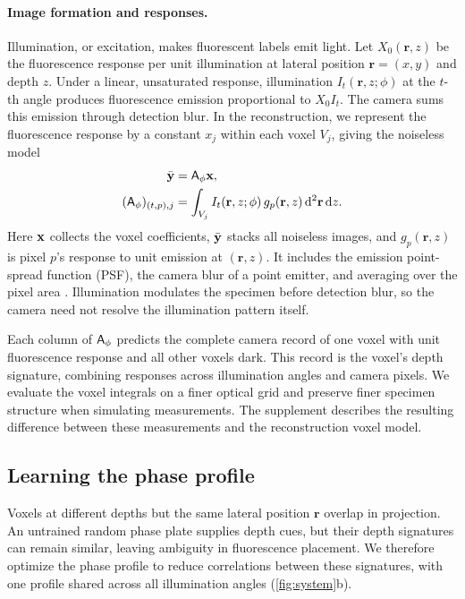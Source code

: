 \paragraph{Image formation and responses.}
Illumination, or excitation, makes fluorescent labels emit light. Let $X_0(\mathbf r,z)$ be the fluorescence response per unit illumination at lateral position $\mathbf r=(x,y)$ and depth $z$. Under a linear, unsaturated response, illumination $I_t(\mathbf r,z;\phi)$ at the $t$-th angle produces fluorescence emission proportional to $X_0I_t$. The camera sums this emission through detection blur. In the reconstruction, we represent the fluorescence response by a constant $x_j$ within each voxel $V_j$, giving the noiseless model
\begin{equation}
\begin{aligned}
\bar{\mathbf{y}}&=\mathsf{A}_\phi\mathbf{x},\\
(\mathsf{A}_\phi)_{(t,p),j}
&=\int_{V_j} I_t(\mathbf r,z;\phi)\,g_p(\mathbf r,z)
\,\mathrm d^2\mathbf r\,\mathrm dz.
\end{aligned}
\label{eq:operator}
\end{equation}
Here $\mathbf{x}$ collects the voxel coefficients, $\bar{\mathbf{y}}$ stacks all noiseless images, and $g_p(\mathbf r,z)$ is pixel $p$'s response to unit emission at $(\mathbf r,z)$. It includes the emission point-spread function (PSF), the camera blur of a point emitter, and averaging over the pixel area \cite{yeh2019}. Illumination modulates the specimen before detection blur, so the camera need not resolve the illumination pattern itself.

Each column of $\mathsf{A}_\phi$ predicts the complete camera record of one voxel with unit fluorescence response and all other voxels dark. This record is the voxel's depth signature, combining responses across illumination angles and camera pixels. We evaluate the voxel integrals on a finer optical grid and preserve finer specimen structure when simulating measurements. The supplement describes the resulting difference between these measurements and the reconstruction voxel model.

\subsection{Learning the phase profile}
\label{sec:platelearning}

Voxels at different depths but the same lateral position $\mathbf r$ overlap in projection. An untrained random phase plate supplies depth cues, but their depth signatures can remain similar, leaving ambiguity in fluorescence placement. We therefore optimize the phase profile to reduce correlations between these signatures, with one profile shared across all illumination angles (\cref{fig:system}b).

